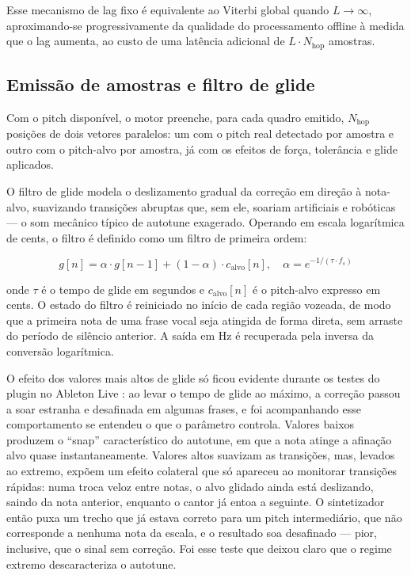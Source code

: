 Esse mecanismo de lag fixo é equivalente ao Viterbi global \cite{mauch2014pyin} quando $L \to \infty$, aproximando-se progressivamente da qualidade do processamento offline à medida que o lag aumenta, ao custo de uma latência adicional de $L \cdot N_{\text{hop}}$ amostras.

\subsection{Emissão de amostras e filtro de glide}

Com o pitch disponível, o motor preenche, para cada quadro emitido, $N_{\text{hop}}$ posições de dois vetores paralelos: um com o pitch real detectado por amostra e outro com o pitch-alvo por amostra, já com os efeitos de força, tolerância e glide aplicados.

O filtro de glide modela o deslizamento gradual da correção em direção à nota-alvo, suavizando transições abruptas que, sem ele, soariam artificiais e robóticas --- o som mecânico típico de autotune exagerado. Operando em escala logarítmica de cents, o filtro é definido como um filtro de primeira ordem:

\begin{equation}
\label{eq:glide}
g[n] = \alpha \cdot g[n-1] + (1-\alpha) \cdot c_{\text{alvo}}[n], \quad \alpha = e^{-1/(\tau \cdot f_s)}
\end{equation}

onde $\tau$ é o tempo de glide em segundos e $c_{\text{alvo}}[n]$ é o pitch-alvo expresso em cents. O estado do filtro é reiniciado no início de cada região vozeada, de modo que a primeira nota de uma frase vocal seja atingida de forma direta, sem arraste do período de silêncio anterior. A saída em Hz é recuperada pela inversa da conversão logarítmica.

O efeito dos valores mais altos de glide só ficou evidente durante os testes do plugin no Ableton Live \cite{ableton_live}: ao levar o tempo de glide ao máximo, a correção passou a soar estranha e desafinada em algumas frases, e foi acompanhando esse comportamento se entendeu o que o parâmetro controla. Valores baixos produzem o ``snap'' característico do autotune, em que a nota atinge a afinação alvo quase instantaneamente. Valores altos suavizam as transições, mas, levados ao extremo, expõem um efeito colateral que só apareceu ao monitorar transições rápidas: numa troca veloz entre notas, o alvo glidado ainda está deslizando, saindo da nota anterior, enquanto o cantor já entoa a seguinte. O sintetizador então puxa um trecho que já estava correto para um pitch intermediário, que não corresponde a nenhuma nota da escala, e o resultado soa desafinado --- pior, inclusive, que o sinal sem correção. Foi esse teste que deixou claro que o regime extremo descaracteriza o autotune.


